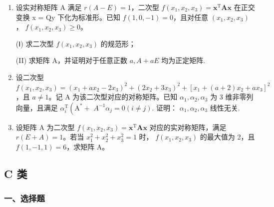 \documentclass[12pt, a4paper]{ctexart}
\begin{document}
\begin{enumerate}[start=9]
    (I) $ m \geq n $;
    
    (II) 若存在 m 维非零列向量 $ \xi $，使得 $ \xi^{T}A\xi=0 $，则 $ r(B)<r(B,\xi) $.

    \item 设实对称矩阵 A 满足 $ r(A - E) = 1 $，二次型 $ f(x_1, x_2, x_3) = \mathbf{x}^\mathrm{T} \mathbf{A} \mathbf{x} $ 在正交变换 x = Qy 下化为标准形。已知 $ f(1, 0, -1) = 0 $，且对任意 $ (x_1, x_2, x_3) $， $ f(x_1, x_2, x_3) \geq 0 $。
    
    (Ⅰ) 求二次型 $ f(x_{1}, x_{2}, x_{3}) $ 的规范形；
    
    (II) 求矩阵 A，并证明对于任意正数 $ a, A + aE $ 均为正定矩阵.

    \item 设二次型 $ f(x_{1},x_{2},x_{3})=(x_{1}+ax_{2}-2x_{3})^{2}+(2x_{2}+3x_{3})^{2}+[x_{1}+(a+2)x_{2}+ax_{3}]^{2} $，且 $ a\neq1 $。记 A 为该二次型对应的对称矩阵。已知 $ \alpha_{1},\alpha_{2},\alpha_{3} $ 为 3 维非零列向量，且满足 $ \alpha_{i}^{\mathrm{T}}\left(\mathrm{A}^{*}+\right. $ $ A^{-1}\alpha_{j}=0(i\neq j) $. 证明： $ \alpha_{1},\alpha_{2},\alpha_{3} $ 线性无关.

    \item 设矩阵 A 为二次型 $ f(x_1, x_2, x_3) = \mathbf{x}^\mathrm{T} \mathbf{A} \mathbf{x} $ 对应的实对称矩阵，满足 $ r(E + A) = 1 $。若当 $ x_1^2 + x_2^2 + x_3^2 = 1 $ 时， $ f(x_1, x_2, x_3) $ 的最大值为 2，且 $ f(1, -1, 1) = 6 $，求矩阵 A。
\end{enumerate}

\subsection{C 类}

\subsubsection*{一、选择题}
\end{document}
